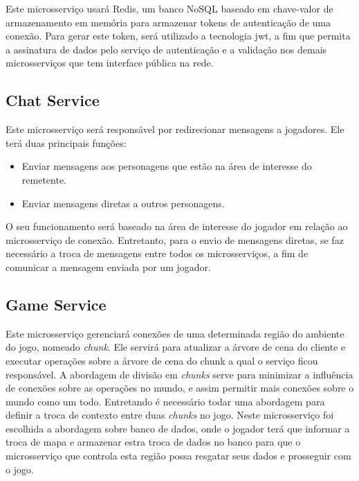 Este microsserviço usará Redis, um banco NoSQL baseado em chave-valor de armazenamento em memória para armazenar tokens de autenticação de uma conexão.
%
Para gerar este token, será utilizado a tecnologia \ac{jwt}, a fim que permita a assinatura de dados pelo serviço de autenticação e a validação nos demais microsserviços que tem interface pública na rede.



\subsection{Chat Service}


Este microsserviço será responsável por redirecionar mensagens a jogadores.
%
Ele terá duas principais funções:



\begin{itemize}
  \item Enviar mensagens aos personagens que estão na área de interesse do remetente.
  \item Enviar mensagens diretas a outros personagens.
\end{itemize}



O seu funcionamento será baseado na área de interesse do jogador em relação ao microsserviço de conexão.
%
Entretanto, para o envio de mensagens diretas, se faz necessário a troca de mensagens entre todos os microsserviços, a fim de comunicar a mensagem enviada por um jogador.



\subsection{Game Service}



Este microsserviço gerenciará conexões de uma determinada região do ambiente do jogo, nomeado \textit{chunk}.
%
Ele servirá para atualizar a árvore de cena do cliente e executar operações sobre a árvore de cena do chunk a qual o serviço ficou responsável.
%
A abordagem de divisão em \textit{chunks} serve para minimizar a influência de conexões sobre as operações no mundo, e assim permitir mais conexões sobre o mundo como um todo.
%
Entretando é necessário todar uma abordagem para definir a troca de contexto entre duas \textit{chunks} no jogo.
%
Neste microsserviço foi escolhida a abordagem sobre banco de dados, onde o jogador terá que informar a troca de mapa e armazenar estra troca de dados no banco para que o microsserviço que controla esta região possa resgatar seus dados e prosseguir com o jogo.



